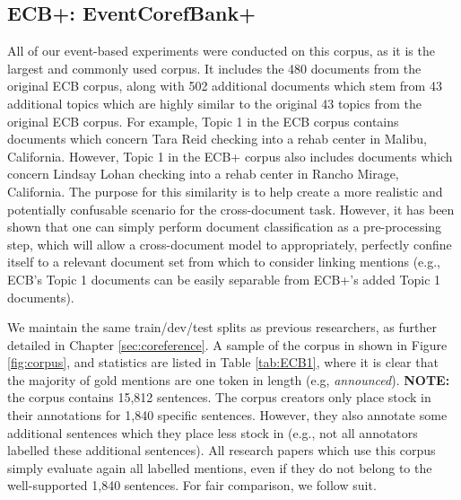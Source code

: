 \subsection{ECB+: EventCorefBank+}
All of our event-based experiments were conducted on this corpus, as it is the largest and commonly used corpus.  It includes the 480 documents from the original ECB corpus, along with 502 additional documents which stem from 43 additional topics which are highly similar to the original 43 topics from the original ECB corpus.  For example, Topic 1 in the ECB corpus contains documents which concern Tara Reid checking into a rehab center in Malibu, California.  However, Topic 1 in the ECB+ corpus also includes documents which concern Lindsay Lohan checking into a rehab center in Rancho Mirage, California.  The purpose for this similarity is to help create a more realistic and potentially confusable scenario for the cross-document task.  However, it has been shown \cite{journals/tacl/YangCF15} that one can simply perform document classification as a pre-processing step, which will allow a cross-document model to appropriately, perfectly confine itself to a relevant document set from which to consider linking mentions (e.g., ECB's Topic 1 documents can be easily separable from ECB+'s added Topic 1 documents).

We maintain the same train/dev/test splits as previous researchers, as further detailed in Chapter \ref{sec:coreference}.  A sample of the corpus in shown in Figure \ref{fig:corpus}, and statistics are listed in Table \ref{tab:ECB1}, where it is clear that the majority of gold mentions are one token in length (e.g, \textit{announced}).  \textbf{NOTE:} the corpus contains 15,812 sentences.  The corpus creators only place stock in their annotations for 1,840 specific sentences.  However, they also annotate some additional sentences which they place less stock in (e.g., not all annotators labelled these additional sentences).  All research papers which use this corpus simply evaluate again all labelled mentions, even if they do not belong to the well-supported 1,840 sentences.  For fair comparison, we follow suit.

